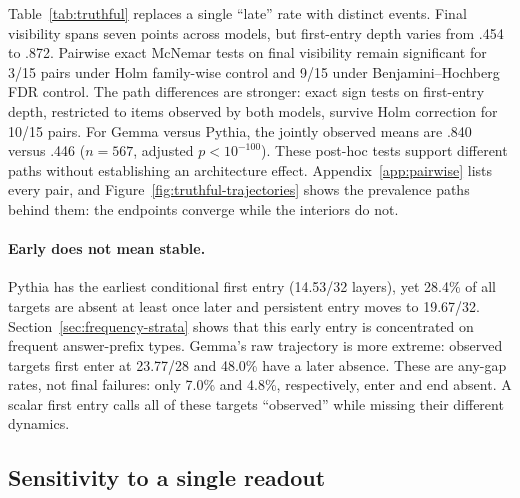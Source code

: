 \documentclass[11pt]{article}
\begin{document}
Table~\ref{tab:truthful} replaces a single ``late'' rate with distinct events. Final visibility spans seven points across models, but first-entry depth varies from .454 to .872. Pairwise exact McNemar tests on final visibility remain significant for 3/15 pairs under Holm family-wise control and 9/15 under Benjamini--Hochberg FDR control. The path differences are stronger: exact sign tests on first-entry depth, restricted to items observed by both models, survive Holm correction for 10/15 pairs. For Gemma versus Pythia, the jointly observed means are .840 versus .446 ($n{=}567$, adjusted $p<10^{-100}$). These post-hoc tests support different paths without establishing an architecture effect. Appendix~\ref{app:pairwise} lists every pair, and Figure~\ref{fig:truthful-trajectories} shows the prevalence paths behind them: the endpoints converge while the interiors do not.

\paragraph{Early does not mean stable.}
Pythia has the earliest conditional first entry (14.53/32 layers), yet 28.4\% of all targets are absent at least once later and persistent entry moves to 19.67/32. Section~\ref{sec:frequency-strata} shows that this early entry is concentrated on frequent answer-prefix types. Gemma's raw trajectory is more extreme: observed targets first enter at 23.77/28 and 48.0\% have a later absence. These are any-gap rates, not final failures: only 7.0\% and 4.8\%, respectively, enter and end absent. A scalar first entry calls all of these targets ``observed'' while missing their different dynamics.

\subsection{Sensitivity to a single readout}
\begin{table}[t]
\centering\small
{}
\caption{Leave-one-readout-out sensitivity (percent). Prev. is top-10 prevalence at the flagged layer; Missing $D$ treats it as unobserved. The layer is selected post hoc, so this is a fragility diagnostic, not a corrected lens.}
\label{tab:layer-sensitivity}
\end{table}
\end{document}
